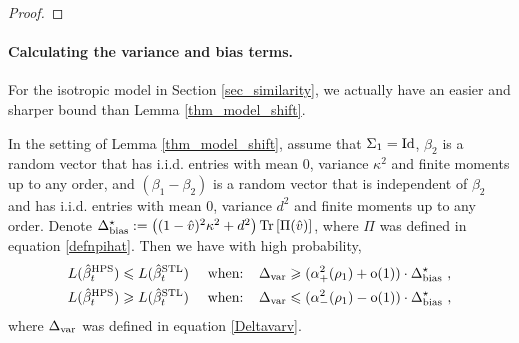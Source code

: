 \begin{proof}
\end{proof}
  
\paragraph{Calculating the variance and bias terms.} For the isotropic model in Section \ref{sec_similarity}, we actually have an easier and sharper bound than Lemma \ref{thm_model_shift}. %
\begin{lemma}\label{prop_model_shift_tight}
		In the setting of Lemma \ref{thm_model_shift}, assume that $\Sigma_1 =\operatorname{Id}$,
		$\beta_2$ is a random vector that has i.i.d. entries with mean $0$, variance $\kappa^2$ and finite moments up to any order, and $(\beta_1-\beta_2)$ is a random vector that is independent of $\beta_2$ and has i.i.d. entries with mean $0$, variance $d^2$ and finite moments up to any order. Denote
		$\Delta^\star_{\text{bias}} := \left({(1 - \hat{v})^2 \kappa^2 + d^2}\right) \operatorname{Tr}\left[\Pi(\hat v)\right]$, where $\Pi$ was defined in equation \eqref{defnpihat}.	Then we have with high probability,
		\begin{align*}
			L(\hat{\beta}_t^{\textup{HPS}}) \leqslant L(\hat{\beta}_t^{\textup{STL}})\quad \text{ when: }\ \  & \Delta_{\text{var}} \geqslant  (\alpha_+^2(\rho_1)+\operatorname{o}(1))\cdot  \Delta^\star_{\text{bias}} \ , \\
			L(\hat{\beta}_t^{\textup{HPS}}) \geqslant L(\hat{\beta}_t^{\textup{STL}})\quad \text{ when: }\ \  & \Delta_{\text{var}} \leqslant (\alpha_-^2(\rho_1)-\operatorname{o}(1))\cdot  \Delta^\star_{\text{bias}}\ ,
		\end{align*}
		where $\Delta_{\text{var}}$ was defined in equation \eqref{Deltavarv}.
\end{lemma}

